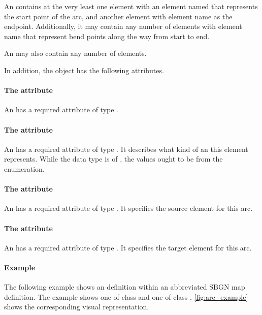 An \Arc contains at the very least one \Point element with an element named  that represents the start point of the arc, and another \Point element with element name  as the endpoint. Additionally, it may contain any number of \Point elements with element name  that represent bend points along the way from start to end. 

An \Arc may also contain any number of \Port elements.

In addition, the \Arc object has the following attributes.

\paragraph{The \fixttspace{} attribute}

An \Arc has a required attribute  of type .


\paragraph{The \fixttspace{} attribute}

An \Arc has a required attribute  of type
. It describes what kind of an \Arc this element represents. While the data type is of , the values ought to be from the  enumeration. 

\paragraph{The \fixttspace{} attribute}

An \Arc has a required attribute  of type
. It specifies the source element for this arc. 


\paragraph{The \fixttspace{} attribute}

An \Arc has a required attribute  of type
. It specifies the target element for this arc. 

\paragraph{Example}

The following example shows an \Arc definition within an abbreviated SBGN map definition. The example shows one \Arc of class  and one \Arc of class . \ref{fig:arc_example} shows the corresponding visual representation.

